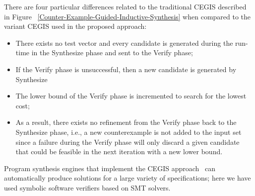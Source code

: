 There are four particular differences related to the traditional CEGIS described in Figure ~\ref{Counter-Example-Guided-Inductive-Synthesis} when compared to the variant CEGIS used in the proposed approach: 

\begin{itemize}
\item There exists no test vector and every candidate is generated during the run-time in the {\sc Synthesize} phase and sent to the {\sc Verify} phase; 
\item If the {\sc Verify} phase is unsuccessful, then a new candidate is generated by {\sc Synthesize} 
\item The lower bound of the {\sc Verify} phase is incremented to search for the lowest cost; 
\item As a result, there exists no refinement from the {\sc Verify} phase back to the {\sc Synthesize} phase, i.e., a new counterexample is not added to the {\sc input} set since a failure during the {\sc Verify} phase will only discard a given candidate that could be feasible in the next iteration with a new lower bound.
\end{itemize}

Program synthesis engines that implement the CEGIS approach~\cite{sketch} can automatically produce solutions for a large variety of specifications; here we have used symbolic software verifiers based on SMT solvers.


